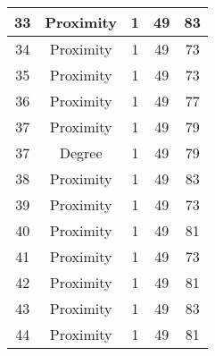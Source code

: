 \documentclass[results.tex]{subfiles}
\begin{document}
\begin{center}
\begin{tabular}{| c || c | c | c | c |}
            \hline
            33                      & Proximity                    & 1                      & 49                      & 83                   \\
            \hline
            34                      & Proximity                    & 1                      & 49                      & 73                   \\
            \hline
            35                      & Proximity                    & 1                      & 49                      & 73                   \\
            \hline
            36                      & Proximity                    & 1                      & 49                      & 77                   \\
            \hline
            37                      & Proximity                    & 1                      & 49                      & 79                   \\
            \hline
            37                      & Degree                       & 1                      & 49                      & 79                   \\
            \hline
            38                      & Proximity                    & 1                      & 49                      & 83                   \\
            \hline
            39                      & Proximity                    & 1                      & 49                      & 73                   \\
            \hline
            40                      & Proximity                    & 1                      & 49                      & 81                   \\
            \hline
            41                      & Proximity                    & 1                      & 49                      & 73                   \\
            \hline
            42                      & Proximity                    & 1                      & 49                      & 81                   \\
            \hline
            43                      & Proximity                    & 1                      & 49                      & 83                   \\
            \hline
            44                      & Proximity                    & 1                      & 49                      & 81                   \\

\end{tabular}
\end{center}
\end{document}
